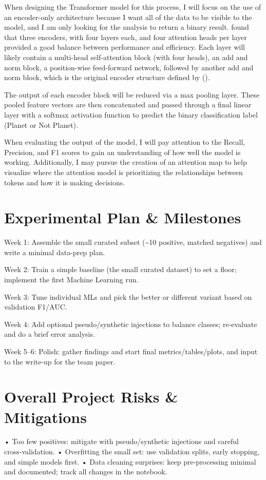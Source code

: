 \documentclass[letterpaper]{article} %
\begin{document}
When designing the Transformer model for this process, I will focus on the use of an encoder-only architecture because I want all of the data to be visible to the model, and I am only looking for the analysis to return a binary result. \citeauthor{salinas2023distinguishingtransitfalsepositives} found that three encoders, with four layers each, and four attention heads per layer provided a good balance between performance and efficiency. Each layer will likely contain a multi-head self-attention block (with four heads), an add and norm block, a position-wise feed-forward network, followed by another add and norm block, which is the original encoder structure defined by \citeauthor{vaswani2017attentionneed} (\citeyear{vaswani2017attentionneed}). 

The output of each encoder block will be reduced via a max pooling layer. These pooled feature vectors are then concatenated and passed through a final linear layer with a softmax activation function to predict the binary classification label (Planet or Not Planet).

When evaluating the output of the model, I will pay attention to the Recall, Precision, and F1 scores to gain an understanding of how well the model is working. Additionally, I may pursue the creation of an attention map to help visualize where the attention model is prioritizing the relationships between tokens and how it is making decisions. 

\section*{Experimental Plan \& Milestones}
Week 1: Assemble the small curated subset (\textasciitilde{}10 positive, matched negatives) and write a minimal data-prep plan.

Week 2: Train a simple baseline (the small curated dataset) to set a floor; implement the first Machine Learning run.

Week 3: Tune individual MLs and pick the better or different variant based on validation F1/AUC.

Week 4: Add optional pseudo/synthetic injections to balance classes; re‑evaluate and do a brief error analysis.

Week 5–6: Polish: gather findings and start final metrics/tables/plots, and input to the write‑up for the team paper.

\section*{Overall Project Risks \& Mitigations}
• Too few positives: mitigate with pseudo/synthetic injections and careful cross‑validation.
• Overfitting the small set: use validation splits, early stopping, and simple models first.
• Data cleaning surprises: keep pre-processing minimal and documented; track all changes in the notebook.
\end{document}

